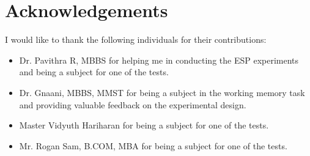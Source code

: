 \section*{Acknowledgements}

I would like to thank the following individuals for their contributions:
\begin{itemize}
    \item Dr. Pavithra R, MBBS for helping me in conducting the ESP experiments and being a subject for one of the tests.
    \item Dr. Gnaani, MBBS, MMST for being a subject in the working memory task and providing valuable feedback on the experimental design.
    \item Master Vidyuth Hariharan for being a subject for one of the tests.
    \item Mr. Rogan Sam, B.COM, MBA for being a subject for one of the tests.
   
\end{itemize}
